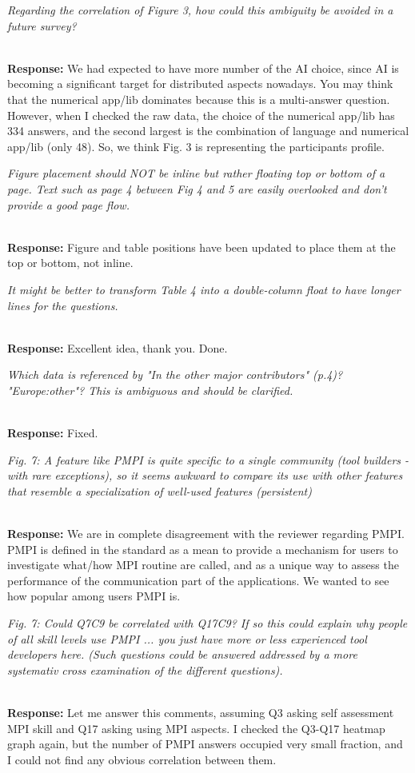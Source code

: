 \documentclass[11pt]{article}
\newcommand{\iresponse}[2]{{\item \em #1}\\%
  {\bf Response:} #2}
\begin{document}
\begin{enumerate}
\iresponse{Regarding the correlation of Figure 3, how could this
  ambiguity be avoided in a future survey?}
{We had expected to have more number of the AI choice, since AI is
  becoming a significant target for distributed aspects nowadays. You may think that the numerical
  app/lib dominates because this is a multi-answer question. However,
  when I checked the raw data, the choice of the numerical app/lib has
  334 answers, and the second largest is the combination of language and
  numerical app/lib (only 48). So, we think Fig. 3 is representing the
  participants profile. }

\iresponse{Figure placement should NOT be inline but rather floating
  top or bottom of a page. Text such as page 4 between Fig 4 and 5 are
  easily overlooked and don't provide a good page flow.}
{Figure and table positions have been updated to place them at the top or
  bottom, not inline.}

\iresponse{It might be better to transform Table 4 into a
  double-column float to have longer lines for the questions.}
{Excellent idea, thank you. Done.}

\iresponse{Which data is referenced by "In the other major
  contributors" (p.4)? "Europe:other"? This is ambiguous and should be
  clarified.}
{Fixed.}

\iresponse{Fig. 7: A feature like PMPI is quite specific to a single
  community (tool builders - with rare exceptions), so it seems awkward
  to compare its use with other features that resemble a
  specialization of well-used features (persistent)}
{We are in complete disagreement with the reviewer regarding PMPI. PMPI is defined in the
standard as a mean to provide a mechanism
for users to investigate what/how MPI routine are called, and as a unique way to
assess the performance of the communication part of the applications. We wanted to
see how popular among users PMPI is.}

\iresponse{Fig. 7: Could Q7C9 be correlated with Q17C9? If so this
  could explain why people of all skill levels use PMPI ... you just
  have more or less experienced tool developers here. (Such questions
  could be answered addressed by a more systemativ cross examination
  of the different questions).}
{Let me answer this comments, assuming Q3 asking self assessment MPI
  skill and Q17 asking using MPI aspects. I checked the Q3-Q17 heatmap
graph again, but the number of PMPI answers occupied very small
fraction, and I could not find any obvious correlation between them.}


\end{enumerate}
\end{document}
